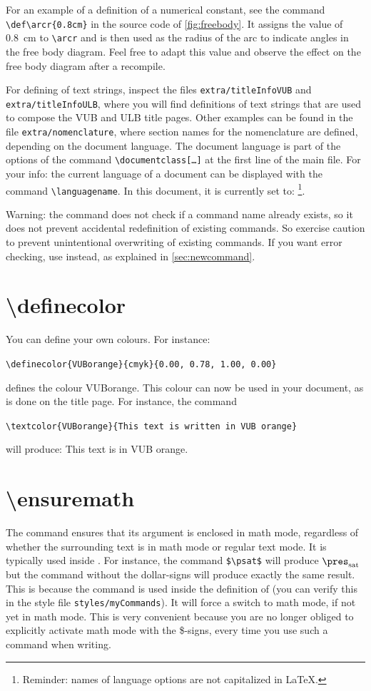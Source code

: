 For an example of a definition of a numerical constant, see the command \verb|\def\arcr{0.8cm}| in the source code of \cref{fig:freebody}. It assigns the value of 0.8~cm to \verb|\arcr| and is then used as the radius of the arc to indicate angles in the free body diagram. Feel free to adapt this value and observe the effect on the free body diagram after a recompile.

For defining of text strings, inspect the files \texttt{extra/titleInfoVUB} and \texttt{extra/titleInfoULB}, where you will find definitions of text strings that are used to compose the VUB and ULB title pages. Other examples can be found in the file \texttt{extra/nomenclature}, where section names for the nomenclature are defined, depending on the document language. The document language is part of the options of the command \texttt{\textbackslash documentclass[\dots]} at the first line of the main file. For your info: the current language of a document can be displayed with the command \verb|\languagename|. In this document, it is currently set to: \texttt{\languagename}\footnote{Reminder: names of language options are not capitalized in \LaTeX.}.

Warning: the command  does not check if a command name already exists, so it does not prevent accidental redefinition of existing commands. So exercise caution to prevent unintentional overwriting of existing commands. If you want error checking, use  instead, as explained in \cref{sec:newcommand}.

\section{\textbackslash definecolor}
You can define your own colours. For instance:

\verb|\definecolor{VUBorange}{cmyk}{0.00, 0.78, 1.00, 0.00}|

defines the colour VUBorange. This colour can now be used in your document, as is done on the title page. For instance, the command 

\verb|\textcolor{VUBorange}{This text is written in VUB orange}|

will produce: \textcolor{VUBorange}{This text is in VUB orange}.

\section{\textbackslash ensuremath}
The command  ensures that its argument is enclosed in math mode, regardless of whether the surrounding text is in math mode or regular text mode. It is typically used inside . For instance, the command \verb|$\psat$| will produce $\psat$ but the command without the dollar-signs  will produce exactly the same result. This is because the command  is used inside the definition of  (you can verify this in the style file \verb|styles/myCommands|). It will force a switch to math mode, if not yet in math mode. This is very convenient because you are no longer obliged to explicitly activate math mode with the \$-signs, every time you use such a command when writing.

